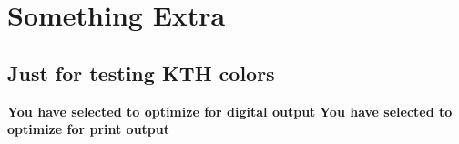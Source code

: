 \documentclass[english, bibtex]{kththesis}
\begin{document}
\ifbiblatex
    \printbibliography[heading=bibintoc]
\else
    
\fi




\cleardoublepage
\appendix
\renewcommand{\chaptermark}[1]{\markboth{Appendix \thechapter\relax:\thinspace\relax#1}{}}
\chapter{Something Extra}

\section{Just for testing KTH colors}
\ifdigitaloutput
    \textbf{You have selected to optimize for digital output}
\else
    \textbf{You have selected to optimize for print output}
\fi
\end{document}
